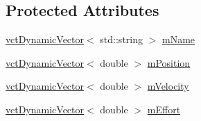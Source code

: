 \subsection*{Protected Attributes}
\begin{DoxyCompactItemize}
\item 
\hyperlink{classvct_dynamic_vector}{vct\-Dynamic\-Vector}$<$ std\-::string $>$ \hyperlink{classprm_state_joint_af2b508570a499e28c0f0b1b053a4a2a9}{m\-Name}
\item 
\hyperlink{classvct_dynamic_vector}{vct\-Dynamic\-Vector}$<$ double $>$ \hyperlink{classprm_state_joint_a972eaf819d71ce20ea31fdfb89e5cfe1}{m\-Position}
\item 
\hyperlink{classvct_dynamic_vector}{vct\-Dynamic\-Vector}$<$ double $>$ \hyperlink{classprm_state_joint_a43b15bb52cfb414b66ff36dfbef22a42}{m\-Velocity}
\item 
\hyperlink{classvct_dynamic_vector}{vct\-Dynamic\-Vector}$<$ double $>$ \hyperlink{classprm_state_joint_a9b3a309dd01a0b23284f9b7fd0be40f8}{m\-Effort}
\end{DoxyCompactItemize}


